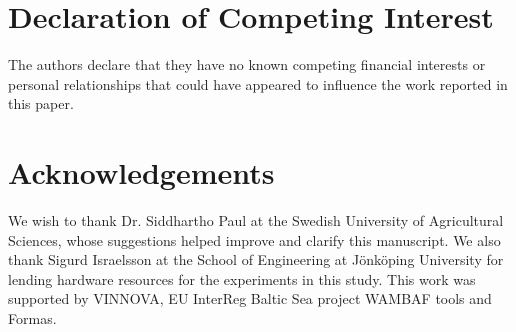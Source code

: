 \documentclass[11pt, review]{elsarticle} %
\begin{document}
\section*{Declaration of Competing Interest}

The authors declare that they have no known competing financial interests or personal relationships that could have appeared to influence the work reported in this paper.

\section*{Acknowledgements}
We wish to thank Dr. Siddhartho Paul at the Swedish University of Agricultural Sciences, whose suggestions helped improve and clarify this manuscript. We also thank Sigurd Israelsson at the School of Engineering at J\"onk\"oping University for lending hardware resources for the experiments in this study. This work was supported by VINNOVA, EU InterReg Baltic Sea project WAMBAF tools and Formas.



\end{document}
